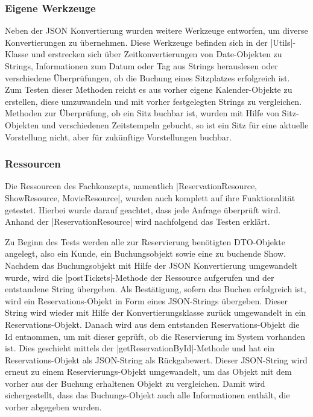 \subsubsection{Eigene Werkzeuge}

Neben der \acs{JSON} Konvertierung wurden weitere Werkzeuge entworfen, um diverse Konvertierungen zu übernehmen.
Diese Werkzeuge befinden sich in der \jinline |Utils|-Klasse und erstrecken sich über Zeitkonvertierungen von Date-Objekten zu Strings, Informationen zum Datum oder Tag aus Strings herauslesen oder verschiedene Überprüfungen, ob die Buchung eines Sitzplatzes erfolgreich ist.
Zum Testen dieser Methoden reicht es aus vorher eigene Kalender-Objekte zu erstellen, diese umzuwandeln und mit vorher festgelegten Strings zu vergleichen.
Methoden zur Überprüfung, ob ein Sitz buchbar ist, wurden mit Hilfe von Sitz-Objekten und verschiedenen Zeitstempeln gebucht, so ist ein Sitz für eine aktuelle Vorstellung nicht, aber für zukünftige Vorstellungen buchbar.

\subsubsection{Ressourcen}
Die Ressourcen des Fachkonzepts, namentlich \jinline |ReservationResource, ShowResource, MovieResource|, wurden auch komplett auf ihre Funktionalität getestet.
Hierbei wurde darauf geachtet, dass jede Anfrage überprüft wird. Anhand der \jinline |ReservationResource| wird nachfolgend das Testen erklärt.

Zu Beginn des Tests werden alle zur Reservierung benötigten \acs{DTO}-Objekte angelegt, also ein Kunde, ein Buchungsobjekt sowie eine zu buchende Show.
Nachdem das Buchungsobjekt mit Hilfe der \acs{JSON} Konvertierung umgewandelt wurde, wird die \jinline |postTickets|-Methode der Ressource aufgerufen und der entstandene String übergeben.
Als Bestätigung, sofern das Buchen erfolgreich ist, wird ein Reservations-Objekt in Form eines \acs{JSON}-Strings übergeben. Dieser String wird wieder mit Hilfe der Konvertierungsklasse zurück umgewandelt in ein Reservations-Objekt.
Danach wird aus dem entstanden Reservations-Objekt die Id entnommen, um mit dieser geprüft, ob die Reservierung im System vorhanden ist. Dies geschieht mittels der \jinline |getReservationById|-Methode und hat ein Reservations-Objekt als \acs{JSON}-String als Rückgabewert.
Dieser \acs{JSON}-String wird erneut zu einem Reservierungs-Objekt umgewandelt, um das Objekt mit dem vorher aus der Buchung erhaltenen Objekt zu vergleichen. Damit wird sichergestellt, dass das Buchungs-Objekt auch alle Informationen enthält, die vorher abgegeben wurden.

